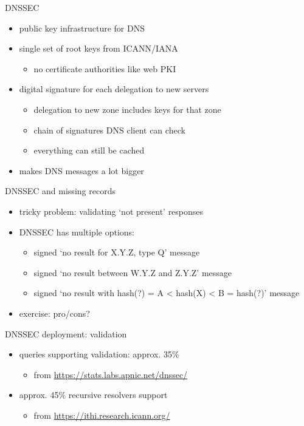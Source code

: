 \begin{frame}{DNSSEC}
    \begin{itemize}
    \item public key infrastructure for DNS
    \item single set of root keys from ICANN/IANA
        \begin{itemize}
        \item no certificate authorities like web PKI
        \end{itemize}
    \item digital signature for each delegation to new servers
        \begin{itemize}
        \item delegation to new zone includes keys for that zone
        \item chain of signatures DNS client can check
        \item everything can still be cached
        \end{itemize}
    \item makes DNS messages a lot bigger
    \end{itemize}
\end{frame}


\begin{frame}{DNSSEC and missing records}
    \begin{itemize}
    \item tricky problem: validating `not present' responses
    \vspace{.5cm}
    \item DNSSEC has multiple options:
        \begin{itemize}
        \item signed `no result for X.Y.Z, type Q' message
        \item signed `no result between W.Y.Z and Z.Y.Z' message
        \item signed `no result with hash(?) = A < hash(X) < B = hash(?)' message
        \end{itemize}
    \item exercise: pro/cons?
    \end{itemize}
\end{frame}

\begin{frame}{DNSSEC deployment: validation}
    \begin{itemize}
    \item queries supporting validation: approx. 35\%
        \begin{itemize}
        \item from \url{https://stats.labs.apnic.net/dnssec/}
        \end{itemize}
    \item approx. 45\% recursive resolvers support 
        \begin{itemize}
        \item from \url{https://ithi.research.icann.org/}
        \end{itemize}
    \end{itemize}
\end{frame}

